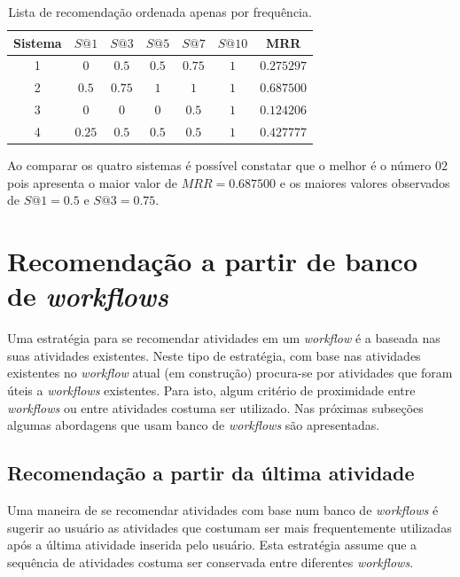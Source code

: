 \begin{table}[!htbp]
	\centering
	\caption{Lista de recomendação ordenada apenas por frequência.}
		\begin{tabular}{|c|c|c|c|c|c|c|} \hline
		\textbf{Sistema} & \textbf{\(S@1\)} & \textbf{\(S@3\)} & \textbf{\(S@5\)} & \textbf{\(S@7\)} & \textbf{\(S@10\)} & \textbf{MRR}	\\ \hline
		1 & \(0\) 	& \(0.5\)	& \(0.5\)	& \(0.75\)	& \(1\) & \(0.275297\) \\ \hline
		2 & \(0.5\)	& \(0.75\)	& \(1\)		& \(1\)		& \(1\) & \(0.687500\) \\ \hline
		3 & \(0\)	& \(0\)		& \(0\)		& \(0.5\)	& \(1\) & \(0.124206\) \\ \hline
		4 & \(0.25\)	& \(0.5\)	& \(0.5\) 	& \(0.5\)	& \(1\) & \(0.427777\) \\ \hline
		\end{tabular}
	\label{tabela_resultados_mrr_Sak}
	\vspace{0.1cm}
\end{table}
Ao comparar os quatro sistemas é possível constatar que o melhor é o número \(02\) pois apresenta o maior valor de \(MRR = 0.687500\) e os maiores valores observados de \(S@1 = 0.5\) e \(S@3 = 0.75\).

\section{Recomendação a partir de banco de \emph{workflows}}\label{SEC_RECOMENDACAO_BASE_WORKFLOWS}
Uma estratégia para se recomendar atividades em um \emph{workflow} é a baseada nas suas atividades existentes. Neste tipo de estratégia, com base nas atividades existentes no \emph{workflow} atual (em construção) procura-se por atividades que foram úteis a \emph{workflows} existentes. Para isto, algum critério de proximidade entre \emph{workflows} ou entre atividades costuma ser utilizado. Nas próximas subseções algumas abordagens que usam banco de \emph{workflows} são apresentadas.

\subsection{Recomendação a partir da última atividade}
Uma maneira de se recomendar atividades com base num banco de \emph{workflows} é sugerir ao usuário as atividades que costumam ser mais frequentemente utilizadas após a última atividade inserida pelo usuário. Esta estratégia assume que a sequência de atividades costuma ser conservada entre diferentes \emph{workflows}.

